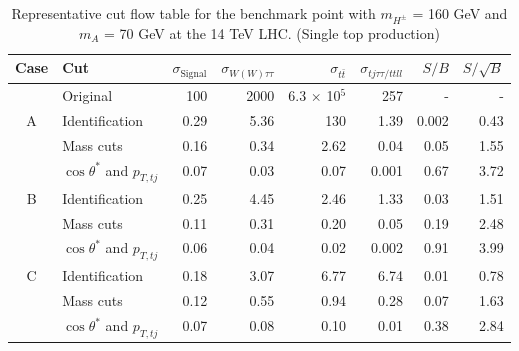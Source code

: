 
\begin{table}
\centering
\strictpagecheck
\begin{adjustwidth*}{0in}{-1.1in}
\caption{Representative cut flow table for the benchmark point with $m_{H^{\pm}}$ = 160 GeV and $m_A$ = 70 GeV at the 14 TeV LHC. (Single top production)}
  \begin{tabular}{clrrrrrr}
    \toprule
 Case   & Cut                           & $\sigma_\text{Signal}$ & $\sigma_{W(W)\tau\tau}$ & $\sigma_{t\bar{t}}$ & $\sigma_{tj\tau\tau/ttll}$ & $S/B$ & $S/\sqrt{B}$\\\midrule
        &  Original                             & 100                    & 2000                    & 6.3 $\times$ 10$^5$ & 257                        & -     & -	\\\midrule
    A   & Identification                & 0.29                   & 5.36                    & 130                 & 1.39                       & 0.002 & 0.43	\\
        & Mass cuts                     & 0.16                   & 0.34                    & 2.62                & 0.04                       & 0.05  & 1.55	\\
        & $\cos\theta^*$ and $p_{T,tj}$ & 0.07                   & 0.03                    & 0.07                & 0.001                      & 0.67  & 3.72	\\\midrule
    B   & Identification                & 0.25                   & 4.45                    & 2.46                & 1.33                       & 0.03  & 1.51	\\
        & Mass cuts                     & 0.11                   & 0.31                    & 0.20                & 0.05                       & 0.19  & 2.48	\\
        & $\cos\theta^*$ and $p_{T,tj}$ & 0.06                   & 0.04                    & 0.02                & 0.002                      & 0.91  & 3.99	\\\midrule
    C   & Identification                & 0.18                   & 3.07                    & 6.77                & 6.74                       & 0.01  & 0.78 \\
        & Mass cuts                     & 0.12                   & 0.55                    & 0.94                & 0.28                       & 0.07  & 1.63 \\
        & $\cos\theta^*$ and $p_{T,tj}$ & 0.07                   & 0.08                    & 0.10                & 0.01                       & 0.38  & 2.84 \\
\bottomrule
\end{tabular}
\label{tab:tj}
\end{adjustwidth*}
\end{table}

